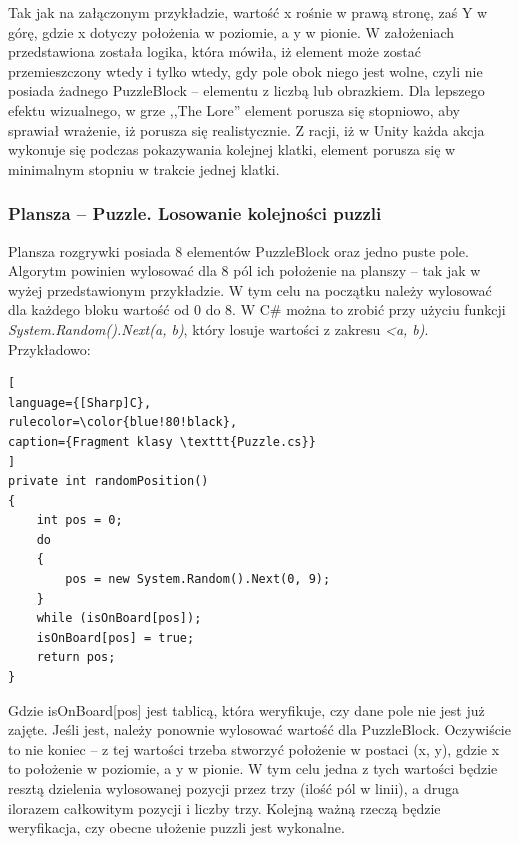 \documentclass[oneside,polski,logo]{amuthesis}
\begin{document}
Tak jak na załączonym przykładzie, wartość x rośnie w prawą stronę, zaś Y w górę, gdzie x dotyczy położenia w poziomie, a y w pionie. W założeniach przedstawiona została logika, która mówiła, iż element może zostać przemieszczony wtedy i tylko wtedy, gdy pole obok niego jest wolne, czyli nie posiada żadnego PuzzleBlock – elementu z liczbą lub obrazkiem. Dla lepszego efektu wizualnego, w grze ,,The Lore'' element porusza się stopniowo, aby sprawiał wrażenie, iż porusza się realistycznie. Z racji, iż w Unity każda akcja wykonuje się podczas pokazywania kolejnej klatki, element porusza się w minimalnym stopniu w trakcie jednej klatki. 

\subsubsection{Plansza – Puzzle. Losowanie kolejności puzzli}
\par Plansza rozgrywki posiada 8 elementów PuzzleBlock oraz jedno puste pole.  Algorytm powinien wylosować dla 8 pól ich położenie na planszy – tak jak w wyżej przedstawionym przykładzie. W tym celu na początku należy wylosować dla każdego bloku wartość od 0 do 8. W C\# można to zrobić przy użyciu funkcji  \emph{System.Random().Next(a, b)}, który losuje wartości z zakresu \emph{<a, b)}. Przykładowo:
\begin{lstlisting}[
language={[Sharp]C},
rulecolor=\color{blue!80!black},
caption={Fragment klasy \texttt{Puzzle.cs}}
]
private int randomPosition()
{
    int pos = 0;
    do
    {
        pos = new System.Random().Next(0, 9);
    }
    while (isOnBoard[pos]);
    isOnBoard[pos] = true;
    return pos;
}
\end{lstlisting}

Gdzie isOnBoard[pos] jest tablicą, która weryfikuje, czy dane pole nie jest już zajęte. Jeśli jest, należy ponownie wylosować wartość dla PuzzleBlock. Oczywiście to nie koniec – z tej wartości trzeba stworzyć położenie w postaci (x, y), gdzie x to położenie w poziomie, a y w pionie. W tym celu jedna z tych wartości będzie resztą dzielenia wylosowanej pozycji przez trzy (ilość pól w linii), a druga ilorazem całkowitym pozycji i liczby trzy. 
Kolejną ważną rzeczą będzie weryfikacja, czy obecne ułożenie puzzli jest wykonalne.
\end{document}
